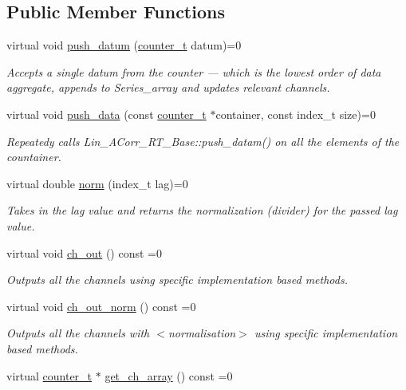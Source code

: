 \subsection*{Public Member Functions}
\begin{DoxyCompactItemize}
\item 
virtual void \hyperlink{classLin__ACorr__RT__Base_a398167525faf2a65f29722e943a0c57e}{push\+\_\+datum} (\hyperlink{types_8hpp_ac89ac912f524b3e3fa3720ea55fec966}{counter\+\_\+t} datum)=0
\begin{DoxyCompactList}\small\item\em Accepts a single {\ttfamily datum} from the counter — which is the lowest order of data aggregate, appends to Series\+\_\+array and updates relevant channels. \end{DoxyCompactList}\item 
virtual void \hyperlink{classLin__ACorr__RT__Base_a91c95a49619995f40aeae80916afed3e}{push\+\_\+data} (const \hyperlink{types_8hpp_ac89ac912f524b3e3fa3720ea55fec966}{counter\+\_\+t} $\ast$container, const index\+\_\+t size)=0
\begin{DoxyCompactList}\small\item\em Repeatedy calls {\ttfamily Lin\+\_\+\+A\+Corr\+\_\+\+R\+T\+\_\+\+Base\+::push\+\_\+datam()} on all the elements of the countainer. \end{DoxyCompactList}\item 
virtual double \hyperlink{classLin__ACorr__RT__Base_a06c0bbe593f87a9034aa34e95d9d46db}{norm} (index\+\_\+t lag)=0
\begin{DoxyCompactList}\small\item\em Takes in the lag value and returns the normalization (divider) for the passed lag value. \end{DoxyCompactList}\item 
virtual void \hyperlink{group__Lin__ACorr__Base__Out_ga4fe3bd7a6a98388d46827d22dc4596c9}{ch\+\_\+out} () const =0
\begin{DoxyCompactList}\small\item\em Outputs all the channels using specific implementation based methods. \end{DoxyCompactList}\item 
virtual void \hyperlink{group__Lin__ACorr__Base__Out_ga3e58cb03c3a93107758d506c53cf2461}{ch\+\_\+out\+\_\+norm} () const =0
\begin{DoxyCompactList}\small\item\em Outputs all the channels with {\bfseries } $<$normalisation$>$ using specific implementation based methods. \end{DoxyCompactList}\item 
virtual \hyperlink{types_8hpp_ac89ac912f524b3e3fa3720ea55fec966}{counter\+\_\+t} $\ast$ \hyperlink{group__Lin__ACorr__Base__Out_gafb6585805776a54d5e4f120cfd1fea9e}{get\+\_\+ch\+\_\+array} () const =0
\end{DoxyCompactItemize}


